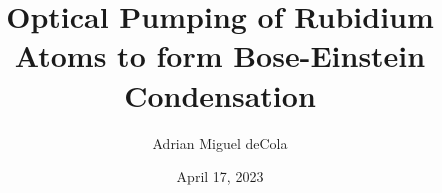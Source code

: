\documentclass[12pt,oneside, reqno]{amsbook}
\numberwithin{equation}{chapter}
\numberwithin{figure}{chapter}
\theoremstyle{plain} %
\theoremstyle{definition}
\theoremstyle{remark}
\begin{document}
\frontmatter %
\title[]{Optical Pumping of Rubidium Atoms to form Bose-Einstein Condensation}
\author{Adrian Miguel deCola}
\address{Department of Physics and Astronomy \\Bates College\\Lewiston, ME 04240}
\date{April 17, 2023}
\maketitle

\newpage
\thispagestyle{empty} 			%
\setcounter{page}{2}




\tableofcontents








\mainmatter %






%

\backmatter


\end{document}
